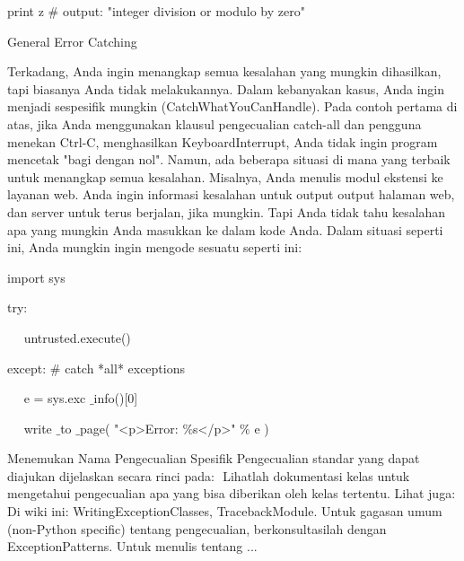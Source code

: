{\fontsize{10pt}{10pt}\selectfont  print z  $  \#  $ output: "integer division or modulo by zero"} 

\vspace{16pt}

General Error Catching 

\vspace{12pt}
 
 \hspace*{0.64in} Terkadang, Anda ingin menangkap semua kesalahan yang mungkin dihasilkan, tapi biasanya Anda tidak melakukannya. Dalam kebanyakan kasus, Anda ingin menjadi sespesifik mungkin (CatchWhatYouCanHandle). Pada contoh pertama di atas, jika Anda menggunakan klausul pengecualian catch-all dan pengguna menekan Ctrl-C, menghasilkan KeyboardInterrupt, Anda tidak ingin program mencetak "bagi dengan nol". Namun, ada beberapa situasi di mana yang terbaik untuk menangkap semua kesalahan. Misalnya, Anda menulis modul ekstensi ke layanan web. Anda ingin informasi kesalahan untuk output output halaman web, dan server untuk terus berjalan, jika mungkin. Tapi Anda tidak tahu kesalahan apa yang mungkin Anda masukkan ke dalam kode Anda. Dalam situasi seperti ini, Anda mungkin ingin mengode sesuatu seperti ini: 
\vspace{12pt}


{\fontsize{10pt}{10pt}\selectfont  import sys}
 

{\fontsize{10pt}{10pt}\selectfont  try:} 


{\fontsize{10pt}{10pt}\selectfont ~~ untrusted.execute()} 


{\fontsize{10pt}{10pt}\selectfont  except:  $  \#  $ catch *all* exceptions} 


{\fontsize{10pt}{10pt}\selectfont ~~ e = sys.exc $  \_  $info()[0]} 


{\fontsize{10pt}{10pt}\selectfont ~~ write $  \_  $to $  \_  $page( "<p>Error:  $  \%  $s</p>"  $  \%  $ e )} 
\vspace{10pt}

 \hspace*{0.64in} Menemukan Nama Pengecualian Spesifik Pengecualian standar yang dapat diajukan dijelaskan secara rinci pada: $  $
 Lihatlah dokumentasi kelas untuk mengetahui pengecualian apa yang bisa diberikan oleh kelas tertentu. Lihat juga: Di wiki ini: WritingExceptionClasses, TracebackModule. Untuk gagasan umum (non-Python specific) tentang pengecualian, berkonsultasilah dengan ExceptionPatterns. Untuk menulis tentang ... 

\vspace{12pt}
 
